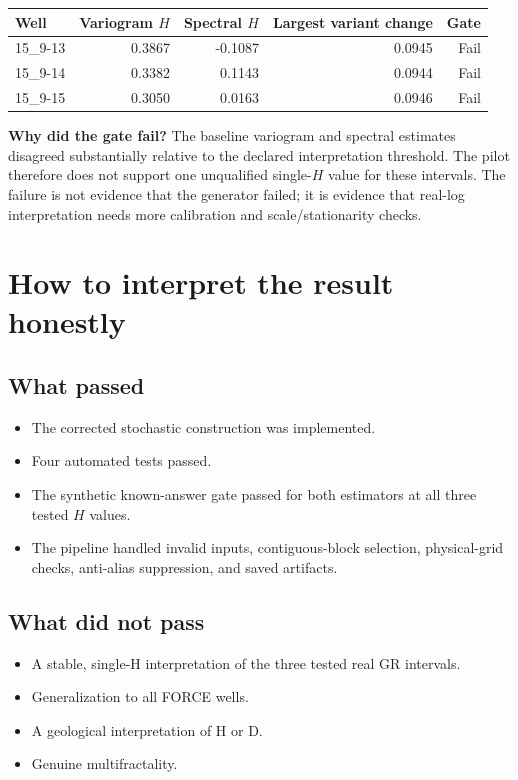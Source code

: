 \documentclass[11pt,a4paper]{article}
\begin{document}
\begin{center}
\begin{tabular}{@{}lrrrr@{}}
\toprule
Well & Variogram $H$ & Spectral $H$ & Largest variant change & Gate\\
\midrule
15\_9-13 & 0.3867 & -0.1087 & 0.0945 & Fail\\
15\_9-14 & 0.3382 & 0.1143 & 0.0944 & Fail\\
15\_9-15 & 0.3050 & 0.0163 & 0.0946 & Fail\\
\bottomrule
\end{tabular}
\end{center}

\textbf{Why did the gate fail?} The baseline variogram and spectral estimates disagreed substantially relative to the declared interpretation threshold. The pilot therefore does not support one unqualified single-$H$ value for these intervals. The failure is not evidence that the generator failed; it is evidence that real-log interpretation needs more calibration and scale/stationarity checks.

\section{How to interpret the result honestly}
\subsection{What passed}
\begin{itemize}
\item The corrected stochastic construction was implemented.
\item Four automated tests passed.
\item The synthetic known-answer gate passed for both estimators at all three tested $H$ values.
\item The pipeline handled invalid inputs, contiguous-block selection, physical-grid checks, anti-alias suppression, and saved artifacts.
\end{itemize}

\subsection{What did not pass}
\begin{itemize}
\item A stable, single-H interpretation of the three tested real GR intervals.
\item Generalization to all FORCE wells.
\item A geological interpretation of H or D.
\item Genuine multifractality.
\end{itemize}
\end{document}
